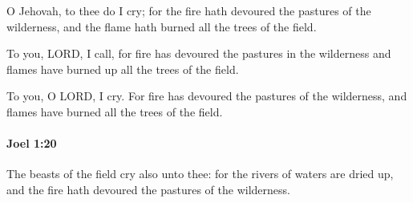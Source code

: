 			\begin{versebox}
					\item[BHS] 
					\item[LXX] 
					\item[ASV] O Jehovah, to thee do I cry; for the fire hath devoured the pastures of the wilderness, and the flame hath burned all the trees of the field.
					\item[NIV] To you, LORD, I call, for fire has devoured the pastures in the wilderness and flames have burned up all the trees of the field.
					\item[NRSV] To you, O LORD, I cry. For fire has devoured the pastures of the wilderness, and flames have burned all the trees of the field.
			\end{versebox}

		\paragraph{Joel 1:20} %
			\label{JOEL-1-20}

			The beasts of the field cry also unto thee: for the rivers of waters are dried up, and the fire hath devoured the pastures of the wilderness.

